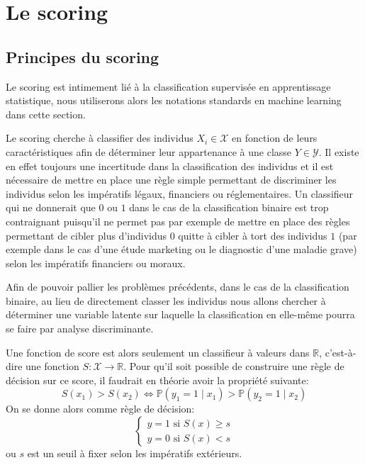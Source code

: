 
\chapter{Le scoring}
\label{chap:un}

\section{Principes du scoring}

Le scoring est intimement lié à la classification supervisée en apprentissage statistique, nous utiliserons alors les notations standards en machine learning dans cette section.

Le scoring cherche à classifier des individus $X_i \in \mathcal{X}$ en fonction de leurs caractéristiques afin de déterminer leur appartenance à une classe $Y \in \mathcal{Y}$. Il existe en effet toujours une incertitude dans la classification des individus et il est nécessaire de mettre en place une règle simple permettant de discriminer les individus selon les impératifs légaux, financiers ou réglementaires. Un classifieur qui ne donnerait que $0$ ou $1$ dans le cas de la classification binaire est trop contraignant puisqu'il ne permet pas par exemple de mettre en place des règles permettant de cibler plus d'individus $0$ quitte à cibler à tort des individus $1$ (par exemple dans le cas d'une étude marketing ou le diagnostic d'une maladie grave) selon les impératifs financiers ou moraux.

Afin de pouvoir pallier les problèmes précédents, dans le cas de la classification binaire, au lieu de directement classer les individus nous allons chercher à déterminer une variable latente sur laquelle la classification en elle-même pourra se faire par analyse discriminante.

Une fonction de score est alors seulement un classifieur à valeurs dans $\mathbb{R}$, c'est-à-dire une fonction $S : \mathcal{X} \rightarrow \mathbb{R}$. Pour qu'il soit possible de construire une règle de décision sur ce score, il faudrait en théorie avoir la propriété suivante:
\begin{equation}
    S(x_1) > S(x_2) \Leftrightarrow \mathbb{P} \left( y_1 = 1 \mid x_1 \right) > \mathbb{P} \left( y_2 = 1 \mid x_2 \right)
    \label{equ:score.ordoné}
\end{equation}
On se donne alors comme règle de décision:
\begin{equation*}
    \begin{cases}
        y = 1 \text{ si } S(x) \geq s \\
        y = 0 \text{ si } S(x) < s
    \end{cases}
\end{equation*}
ou $s$ est un seuil à fixer selon les impératifs extérieurs.

